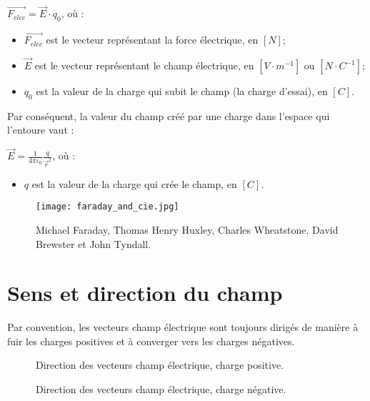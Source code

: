 \begin{encadre}
    \(\vec{F_{elec}}=\vec{E} \cdot q_0\), où :
    \begin{itemize}[label=\textbullet]
        \item \(\vec{F_{elec}}\) est le vecteur représentant la force électrique, en \([N]\);
        \item \(\vec{E}\) est le vecteur représentant le champ électrique, en \([V \cdot m^{-1}]\) ou \([N \cdot C^{-1}]\);
        \item \(q_0\) est la valeur de la charge qui subit le champ (la charge d'essai), en \([C]\).
    \end{itemize}
\end{encadre}

Par conséquent, la valeur du champ créé par une charge dans l'espace qui l'entoure vaut :
\begin{encadre}
    \(\vec{E}=\frac{1}{4 \pi \varepsilon _0} \frac{q}{\vec{r}^2}\), où :
    \begin{itemize}[label=\textbullet]
        \item \(q\) est la valeur de la charge qui crée le champ, en \([C]\).
    \end{itemize}
\end{encadre}

\begin{figure}[!ht]
    \centering
    \texttt{[image: faraday\_and\_cie.jpg]}
    \caption{Michael Faraday, Thomas Henry Huxley, Charles Wheatstone, David Brewster et John Tyndall.}
    \label{club5}
\end{figure}

\newpage


\section{Sens et direction du champ}
Par convention, les vecteurs champ électrique sont toujours dirigés de manière à fuir les charges positives et à converger vers les charges négatives.
\begin{figure}[!ht]
    \centering
    \begin{minipage}[b]{.47\linewidth}
        \centering
        \resizebox{.8\linewidth}{!}{}
        \caption{Direction des vecteurs champ électrique, charge positive.}
        \label{vecteur_champ_q+}
    \end{minipage}
    \begin{minipage}[b]{.47\linewidth}
        \centering
        \resizebox{.8\linewidth}{!}{}
        \caption{Direction des vecteurs champ électrique, charge négative.}
        \label{vecteur_champ_q-}
    \end{minipage}
\end{figure}

